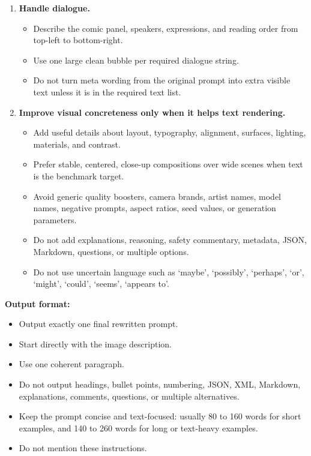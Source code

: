 \begin{tcolorbox}
\begin{enumerate}[leftmargin=1.5em, itemsep=0.2em, topsep=0.2em, parsep=0pt, partopsep=0pt]
    \item \textbf{Handle dialogue.}
    \begin{itemize}[leftmargin=1.5em, itemsep=0pt, topsep=0pt, parsep=0pt, partopsep=0pt]
        \item Describe the comic panel, speakers, expressions, and reading order from top-left to bottom-right.
        \item Use one large clean bubble per required dialogue string.
        \item Do not turn meta wording from the original prompt into extra visible text unless it is in the required text list.
    \end{itemize}

    \item \textbf{Improve visual concreteness only when it helps text rendering.}
    \begin{itemize}[leftmargin=1.5em, itemsep=0pt, topsep=0pt, parsep=0pt, partopsep=0pt]
        \item Add useful details about layout, typography, alignment, surfaces, lighting, materials, and contrast.
        \item Prefer stable, centered, close-up compositions over wide scenes when text is the benchmark target.
        \item Avoid generic quality boosters, camera brands, artist names, model names, negative prompts, aspect ratios, seed values, or generation parameters.
        \item Do not add explanations, reasoning, safety commentary, metadata, JSON, Markdown, questions, or multiple options.
        \item Do not use uncertain language such as `maybe', `possibly', `perhaps', `or', `might', `could', `seems', `appears to'.
    \end{itemize}

\end{enumerate}

\medskip
\textbf{Output format:}
\begin{itemize}[leftmargin=1.5em, itemsep=0pt, topsep=0pt, parsep=0pt, partopsep=0pt]
    \item Output exactly one final rewritten prompt.
    \item Start directly with the image description.
    \item Use one coherent paragraph.
    \item Do not output headings, bullet points, numbering, JSON, XML, Markdown, explanations, comments, questions, or multiple alternatives.
    \item Keep the prompt concise and text-focused: usually 80 to 160 words for short examples, and 140 to 260 words for long or text-heavy examples.
    \item Do not mention these instructions.
\end{itemize}

\end{tcolorbox}



